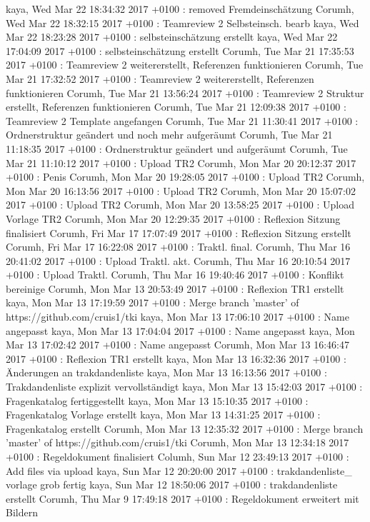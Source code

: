 kaya, Wed Mar 22 18:34:32 2017 +0100 : removed Fremdeinschätzung
Corumh, Wed Mar 22 18:32:15 2017 +0100 : Teamreview 2 Selbsteinsch. bearb
kaya, Wed Mar 22 18:23:28 2017 +0100 : selbsteinschätzung erstellt
kaya, Wed Mar 22 17:04:09 2017 +0100 : selbsteinschätzung erstellt
Corumh, Tue Mar 21 17:35:53 2017 +0100 : Teamreview 2 weitererstellt, Referenzen funktionieren
Corumh, Tue Mar 21 17:32:52 2017 +0100 : Teamreview 2 weitererstellt, Referenzen funktionieren
Corumh, Tue Mar 21 13:56:24 2017 +0100 : Teamreview 2 Struktur erstellt, Referenzen funktionieren
Corumh, Tue Mar 21 12:09:38 2017 +0100 : Teamreview 2 Template angefangen
Corumh, Tue Mar 21 11:30:41 2017 +0100 : Ordnerstruktur geändert und noch mehr aufgeräumt
Corumh, Tue Mar 21 11:18:35 2017 +0100 : Ordnerstruktur geändert und aufgeräumt
Corumh, Tue Mar 21 11:10:12 2017 +0100 : Upload TR2
Corumh, Mon Mar 20 20:12:37 2017 +0100 : Penis
Corumh, Mon Mar 20 19:28:05 2017 +0100 : Upload TR2
Corumh, Mon Mar 20 16:13:56 2017 +0100 : Upload TR2
Corumh, Mon Mar 20 15:07:02 2017 +0100 : Upload TR2
Corumh, Mon Mar 20 13:58:25 2017 +0100 : Upload Vorlage TR2
Corumh, Mon Mar 20 12:29:35 2017 +0100 : Reflexion Sitzung finalisiert
Corumh, Fri Mar 17 17:07:49 2017 +0100 : Reflexion Sitzung erstellt
Corumh, Fri Mar 17 16:22:08 2017 +0100 : Traktl. final.
Corumh, Thu Mar 16 20:41:02 2017 +0100 : Upload Traktl. akt.
Corumh, Thu Mar 16 20:10:54 2017 +0100 : Upload Traktl.
Corumh, Thu Mar 16 19:40:46 2017 +0100 : Konflikt bereinige
Corumh, Mon Mar 13 20:53:49 2017 +0100 : Reflexion TR1 erstellt
kaya, Mon Mar 13 17:19:59 2017 +0100 : Merge branch 'master' of https://github.com/cruis1/tki
kaya, Mon Mar 13 17:06:10 2017 +0100 : Name angepasst
kaya, Mon Mar 13 17:04:04 2017 +0100 : Name angepasst
kaya, Mon Mar 13 17:02:42 2017 +0100 : Name angepasst
Corumh, Mon Mar 13 16:46:47 2017 +0100 : Reflexion TR1 erstellt
kaya, Mon Mar 13 16:32:36 2017 +0100 : Änderungen an trakdandenliste
kaya, Mon Mar 13 16:13:56 2017 +0100 : Trakdandenliste explizit vervollständigt
kaya, Mon Mar 13 15:42:03 2017 +0100 : Fragenkatalog fertiggestellt
kaya, Mon Mar 13 15:10:35 2017 +0100 : Fragenkatalog Vorlage erstellt
kaya, Mon Mar 13 14:31:25 2017 +0100 : Fragenkatalog erstellt
Corumh, Mon Mar 13 12:35:32 2017 +0100 : Merge branch 'master' of https://github.com/cruis1/tki
Corumh, Mon Mar 13 12:34:18 2017 +0100 : Regeldokument finalisiert
Columh, Sun Mar 12 23:49:13 2017 +0100 : Add files via upload
kaya, Sun Mar 12 20:20:00 2017 +0100 : trakdandenliste\_ vorlage grob fertig
kaya, Sun Mar 12 18:50:06 2017 +0100 : trakdandenliste erstellt
Corumh, Thu Mar 9 17:49:18 2017 +0100 : Regeldokument erweitert mit Bildern
